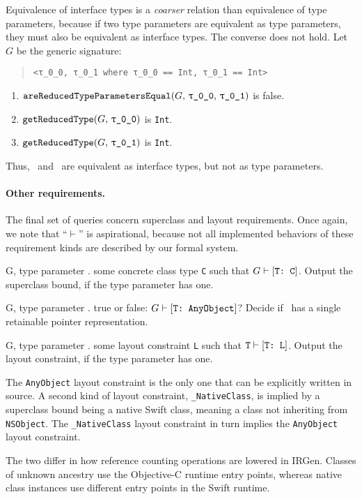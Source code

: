 \documentclass[../generics]{subfiles}
\begin{document}
\begin{example}
Equivalence of interface types is a \emph{coarser} relation than equivalence of type parameters, because if two type parameters are equivalent as type parameters, they must also be equivalent as interface types. The converse does not hold. Let~$G$ be the generic signature:
\begin{quote}
\begin{verbatim}
<τ_0_0, τ_0_1 where τ_0_0 == Int, τ_0_1 == Int>
\end{verbatim}
\end{quote}
\begin{enumerate}
\item $\Query{areReducedTypeParametersEqual}{G,\,\rT,\,\rU}$ is false.
\item $\Query{getReducedType}{G,\,\rT}$ is \texttt{Int}.
\item $\Query{getReducedType}{G,\,\rU}$ is \texttt{Int}.
\end{enumerate}
Thus, \rT\ and \rU\ are equivalent as interface types, but not as type parameters.
\end{example}

\paragraph{Other requirements.} The final set of queries concern superclass and layout requirements. Once again, we note that ``$\vdash$'' is aspirational, because not all implemented behaviors of these requirement kinds are described by our formal system.

\begin{itemize}
{G, \tT}
{type parameter \tT.}
{some concrete class type \texttt{C} such that $G\vdash[\texttt{T:~C}]$.}
{Output the superclass bound, if the type parameter has one.}

{G, \tT}
{type parameter \tT.}
{true or false: $G\vdash[\texttt{T:~AnyObject}]$?}
{Decide if \tT\ has a single retainable pointer representation.}

{G, \tT}
{type parameter \tT.}
{some layout constraint \texttt{L} such that $\texttt{T}\vdash[\texttt{T:~L}]$.}
{Output the layout constraint, if the type parameter has one.}

The \texttt{AnyObject} layout constraint is the only one that can be explicitly written in source. A second kind of layout constraint, \verb|_NativeClass|, is implied by a superclass bound being a native Swift class, meaning a class not inheriting from \texttt{NSObject}. The \verb|_NativeClass| layout constraint in turn implies the \texttt{AnyObject} layout constraint.

The two differ in how reference counting operations are lowered in IRGen. Classes of unknown ancestry use the Objective-C runtime entry points, whereas native class instances use different entry points in the Swift runtime.
\end{itemize}
\end{document}
